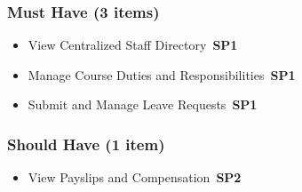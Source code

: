 \documentclass[12pt, a4paper]{article}
\newcommand{\sprintbadge}[1]{\colorbox{agileaccent}{\color{white}\tiny\bfseries\,SP#1\,}}
\begin{document}
\vspace{4pt}

\begin{tcolorbox}[enhanced,colback=agilegreen!5,colframe=agilegreen,boxrule=1pt,arc=5pt,title={\textbf{[3] Staff Module MVP}},fonttitle=\bfseries\color{white},attach boxed title to top left={yshift=-3mm,xshift=6mm},boxed title style={colback=agilegreen,arc=3pt}]
\subsubsection*{Must Have (3 items)}
\begin{itemize}[leftmargin=*,itemsep=3pt,label={$\bullet$}]
\item View Centralized Staff Directory \hfill\sprintbadge{1}
\item Manage Course Duties and Responsibilities \hfill\sprintbadge{1}
\item Submit and Manage Leave Requests \hfill\sprintbadge{1}
\end{itemize}

\subsubsection*{Should Have (1 item)}
\begin{itemize}[leftmargin=*,itemsep=3pt,label={$\bullet$}]
\item View Payslips and Compensation \hfill\sprintbadge{2}
\end{itemize}
\end{tcolorbox}

\vspace{4pt}
\end{document}

